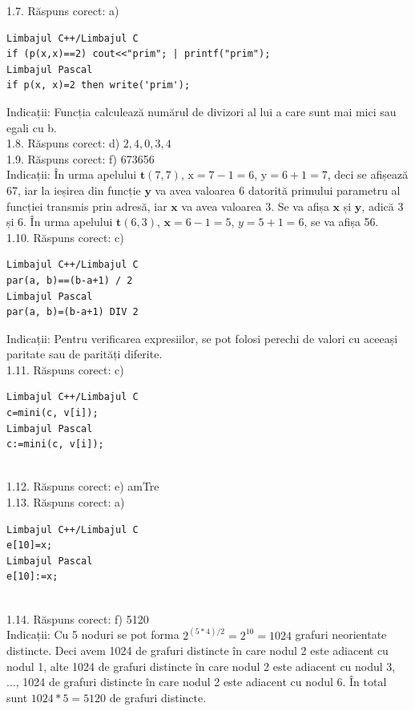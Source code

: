 1.7. Răspuns corect: a)\\
\begin{verbatim}
Limbajul C++/Limbajul C
if (p(x,x)==2) cout<<"prim"; | printf("prim");
Limbajul Pascal
if p(x, x)=2 then write('prim');
\end{verbatim}
Indicații: Funcția calculează numărul de divizori al lui a care sunt mai mici sau egali cu b.\\

1.8. Răspuns corect: d) $2,4,0,3,4$\\

1.9. Răspuns corect: f) 673656\\
Indicații: În urma apelului $\mathbf{t}(7,7)$, $\mathrm{x}=7-1=6$, $\mathrm{y}=6+1=7$, deci se afișează 67, iar la ieșirea din funcție $\mathbf{y}$ va avea valoarea 6 datorită primului parametru al funcției transmis prin adresă, iar $\mathbf{x}$ va avea valoarea 3. Se va afișa $\mathbf{x}$ și $\mathbf{y}$, adică 3 și 6. În urma apelului $\mathbf{t}(6,3)$, $\mathbf{x}=6-1=5$, $y=5+1=6$, se va afișa 56.\\

1.10. Răspuns corect: c)\\
\begin{verbatim}
Limbajul C++/Limbajul C
par(a, b)==(b-a+1) / 2
Limbajul Pascal
par(a, b)=(b-a+1) DIV 2
\end{verbatim}
Indicații: Pentru verificarea expresiilor, se pot folosi perechi de valori cu aceeași paritate sau de parități diferite.\\

1.11. Răspuns corect: c)\\
\begin{verbatim}
Limbajul C++/Limbajul C
c=mini(c, v[i]);
Limbajul Pascal
c:=mini(c, v[i]);
\end{verbatim}\\

1.12. Răspuns corect: e) amTre\\

1.13. Răspuns corect: a)\\
\begin{verbatim}
Limbajul C++/Limbajul C
e[10]=x;
Limbajul Pascal
e[10]:=x;
\end{verbatim}\\

1.14. Răspuns corect: f) 5120\\
Indicații: Cu 5 noduri se pot forma $2^{(5*4)/2}=2^{10}=1024$ grafuri neorientate distincte. Deci avem 1024 de grafuri distincte în care nodul 2 este adiacent cu nodul 1, alte 1024 de grafuri distincte în care nodul 2 este adiacent cu nodul 3, ..., 1024 de grafuri distincte în care nodul 2 este adiacent cu nodul 6. În total sunt $1024 * 5=5120$ de grafuri distincte.\\

